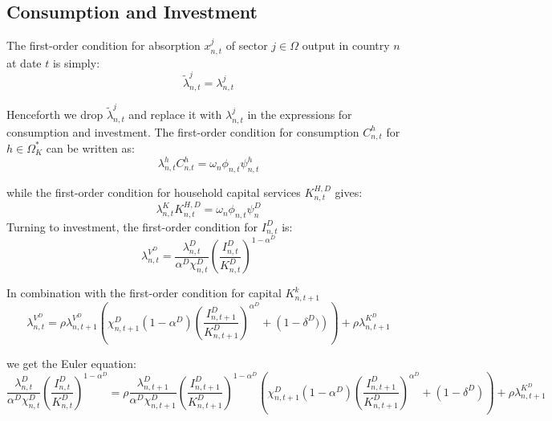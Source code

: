 \documentclass[12pt, bibtotoc, tablecaptionabove, figurecaptionabove, fleqn]{article}
\begin{document}
\subsection{Consumption and Investment}
The first-order condition for absorption $x_{n, t}^{j}$ of sector $j \in \Omega$ output in country $n$ at date $t$ is
simply:
\begin{equation*}
	\tilde{\lambda}_{n, t}^{j}=\lambda_{n, t}^{j}
\end{equation*}

Henceforth we drop $\tilde{\lambda}_{n, t}^{j}$ and replace it with $\lambda_{n, t}^{j}$ in the expressions for consumption and investment.
The first-order condition for consumption $C_{n, t}^{h}$ for $h \in \Omega_{K}^{*}$ can be written as:
\begin{equation*}
	\lambda_{n, t}^{h} C_{n . t}^{h}=\omega_{n} \phi_{n, t} \psi_{n, t}^{h}
\end{equation*}

while the first-order condition for household capital services $K_{n, t}^{H, D}$ gives:
\begin{equation*}
\lambda_{n, t}^{K} K_{n, t}^{H, D}=\omega_{n} \phi_{n, t} \psi^{D}_n
\end{equation*}
Turning to investment, the first-order condition for $I_{n, t}^{D}$ is:
\begin{equation*}
	\lambda_{n, t}^{V^{D}}=\frac{\lambda_{n, t}^{D}}{\alpha^{D} \chi_{n, t}^{D}}\left(\frac{I_{n, t}^{D}}{K_{n, t}^{D}}\right)^{1-\alpha^D}
\end{equation*}

In combination with the first-order condition for capital $K_{n, t+1}^{k}$
\begin{equation*}
	\lambda_{n, t}^{V^{D}}=\rho \lambda_{n, t+1}^{V^{D}}\left(\chi_{n, t+1}^{D}\left(1-\alpha^D\right)\left(\frac{I_{n, t+1}^{D}}{K_{n, t+1}^{D}}\right)^{\alpha^D}+\left(1-\delta^{D})\right)\right)+\rho \lambda_{n, t+1}^{K^{D}}
\end{equation*}

we get the Euler equation:
\begin{equation*}
	\frac{\lambda_{n, t}^{D}}{\alpha^D \chi_{n, t}^{D}}\left(\frac{I_{n, t}^{D}}{K_{n, t}^{D}}\right)^{1-\alpha^D}=\rho \frac{\lambda_{n, t+1}^{D}}{\alpha^D \chi_{n, t+1}^{D}}\left(\frac{I_{n, t+1}^{D}}{K_{n, t+1}^{D}}\right)^{1-\alpha^D}\left(\chi_{n, t+1}^{D}\left(1-\alpha^D\right)\left(\frac{I_{n, t+1}^{D}}{K_{n, t+1}^{D}}\right)^{\alpha^D}+\left(1-\delta^{D}\right)\right)+\rho \lambda_{n, t+1}^{K^{D}}
\end{equation*}
\end{document}
